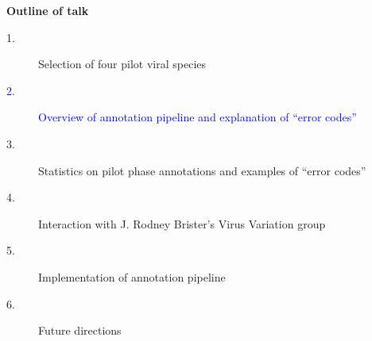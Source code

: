 \documentclass[landscape]{slides}
\begin{document}
\begin{slide}
\begin{center}
\textbf{Outline of talk}

\small
\begin{description}
\item[1.] Selection of four pilot viral species
\item[\textcolor{blue}2.] \textcolor{blue}{Overview of annotation pipeline and explanation of ``error codes''}
\item[3.] Statistics on pilot phase annotations and examples of ``error codes''
\item[4.] Interaction with J. Rodney Brister's Virus Variation group
\item[5.] Implementation of annotation pipeline
\item[6.] Future directions
\end{description}

\end{center}
\vfill
\end{slide}
\end{document}
